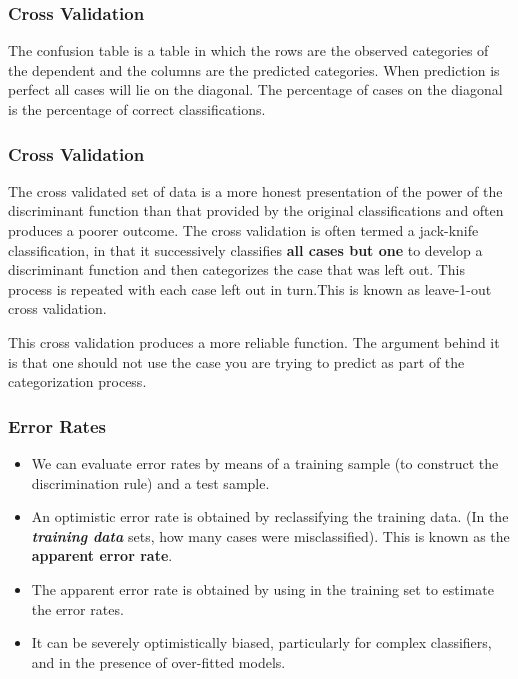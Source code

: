 \documentclass[PredictiveAnalytics101.tex]{subfiles}
\begin{document}
 
\begin{frame}
\frametitle{Cross Validation}

The confusion
table is a table in which the rows are the observed categories of the dependent and
the columns are the predicted categories. When prediction is perfect all cases will lie on the
diagonal. The percentage of cases on the diagonal is the percentage of correct classifications. 
\end{frame}
\begin{frame}
\frametitle{Cross Validation}
\Large
The cross validated set of data is a more honest presentation of the power of the
discriminant function than that provided by the original classifications and often produces
a poorer outcome. The cross validation is often termed a jack-knife classification, in that
it successively classifies \textbf{all cases but one} to develop a discriminant function and then
categorizes the case that was left out. This process is repeated with each case left out in
turn.This is known as leave-1-out cross validation. 
\end{frame}
\begin{frame}

This cross validation produces a more reliable function. The argument behind it is that
one should not use the case you are trying to predict as part of the categorization process.

\end{frame}
\begin{frame}
\frametitle{Error Rates}
\begin{itemize}
\item We can evaluate error rates by means of a training sample (to construct the discrimination rule) and a test sample.


\item An optimistic error rate is obtained by reclassifying the training data. (In the \textbf{\textit{training data}} sets, how many cases were misclassified). This is known as the \textbf{apparent error rate}.


\item The apparent error rate is obtained by using in the training set to estimate
the error rates.
\item It can be severely optimistically biased, particularly for complex classifiers, and in the presence of over-fitted models.
\end{itemize}

\end{frame}
\end{document}
